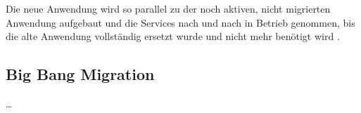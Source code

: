 Die neue Anwendung wird so parallel zu der noch aktiven, nicht migrierten Anwendung aufgebaut und die Services nach und nach in Betrieb genommen, bis die alte Anwendung vollständig ersetzt wurde und nicht mehr benötigt wird \cite[Vgl.][]{MarshBoourdon2019}\cite[Vgl.][]{Ibryam2021}\cite[Vgl.][]{Fowler2004}.
\pagebreak

\subsection{Big Bang Migration}
\dots
\pagebreak